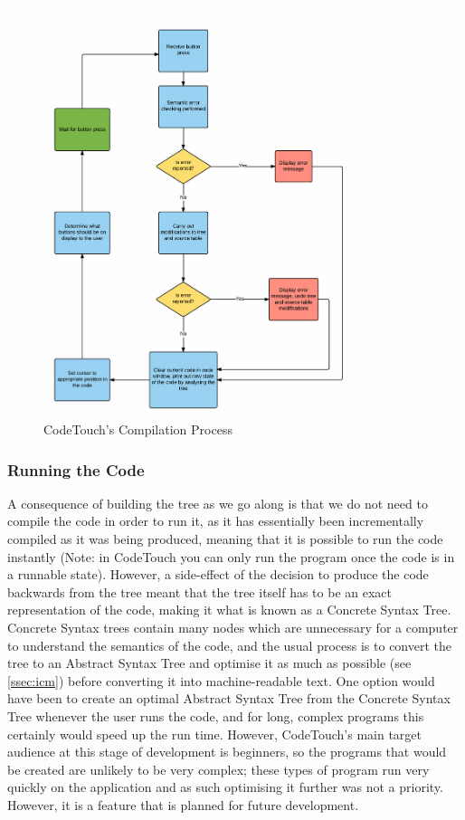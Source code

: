 \documentclass[ %
                    author={Jonathan Rankin},
                supervisor={Dr. David May, Dr. Ian Holyer},
                    degree={MEng},
                     title={CodeTouch},
                  subtitle={A Revolutionary Way To Program Real Code On Touch Screen Devices},
                      type={enterprise},
                      year={2015 } ]{dissertation}
\begin{document}
\begin{enumerate}
\begin{figure}[h]
\centering
\includegraphics[width=0.80\textwidth]{process}
\caption{CodeTouch's Compilation Process}
\label{fig:processes}
\end{figure}

\subsubsection{Running the Code}

A consequence of building the tree as we go along is that we do not need to compile the code in order to run it, as it has essentially been incrementally compiled as it was being produced, meaning that it is possible to run the code instantly (Note: in CodeTouch you can only run the program once the code is in a runnable state). However, a side-effect of the decision to produce the code backwards from the tree meant that the tree itself has to be an exact representation of the code, making it what is known as a Concrete Syntax Tree. Concrete Syntax trees contain many nodes which are unnecessary for a computer to understand the semantics of the code, and the usual process is to convert the tree to an Abstract Syntax Tree and optimise it as much as possible (see \ref{ssec:icm}) before converting it into machine-readable text. One option would have been to create an optimal Abstract Syntax Tree from the Concrete Syntax Tree whenever the user runs the code, and for long, complex programs this certainly would speed up the run time. However, CodeTouch's main target audience at this stage of development is beginners, so the programs that would be created are unlikely to be very complex; these types of program run very quickly on the application and as such optimising it further was not a priority. However, it is a feature that is planned for future development. 



\end{enumerate}
\end{document}

